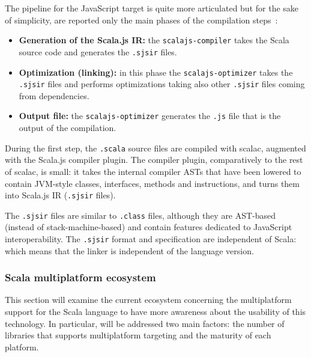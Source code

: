 
The pipeline for the JavaScript target is quite more articulated but for the sake of simplicity, are reported only the main phases of the compilation
steps~\cite{Doeraene:256862}:
\begin{itemize}
	\item \textbf{Generation of the Scala.js IR:} the \texttt{scalajs-compiler} takes the Scala source code and generates the \texttt{.sjsir} files.
	\item \textbf{Optimization (linking):} in this phase the \texttt{scalajs-optimizer} takes the \texttt{.sjsir} files and performs optimizations
	      taking also other \texttt{.sjsir} files coming from dependencies.
	\item \textbf{Output file:} the \texttt{scalajs-optimizer} generates the \texttt{.js} file that is the output of the compilation.
\end{itemize}

During the first step, the \texttt{.scala} source files are compiled with scalac, augmented with the Scala.js compiler plugin.
The compiler plugin, comparatively to the rest of scalac, is small: it takes the internal compiler ASTs that have been lowered to contain JVM-style
classes, interfaces, methods and instructions, and turns them into Scala.js IR (\texttt{.sjsir} files).

The \texttt{.sjsir} files are similar to \texttt{.class} files, although they are AST-based (instead of stack-machine-based) and contain features
dedicated to JavaScript interoperability. The \texttt{.sjsir} format and specification are independent of Scala: which means that the linker is
independent of the language version.

\subsubsection*{Scala multiplatform ecosystem}

This section will examine the current ecosystem concerning the multiplatform support for the Scala language to have more awareness about the
usability of this technology.
In particular, will be addressed two main factors: the number of libraries that supports multiplatform targeting and the maturity of each platform.

